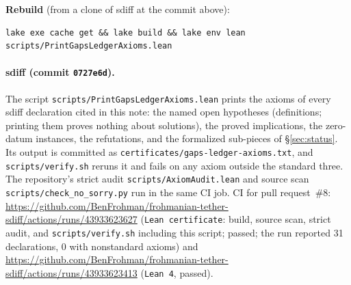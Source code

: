 \documentclass[11pt]{article}
\theoremstyle{plain}
\theoremstyle{definition}
\theoremstyle{remark}
\newcommand{\sdiffsha}{0727e6d}
\begin{document}
\begin{framed}
\textbf{Rebuild} (from a clone of sdiff at the commit above):
\begin{lstlisting}
lake exe cache get && lake build && lake env lean scripts/PrintGapsLedgerAxioms.lean
\end{lstlisting}
\end{framed}

\paragraph{sdiff (commit \texttt{\sdiffsha}).}
The script \texttt{scripts/\hspace{0pt}PrintGapsLedgerAxioms.\hspace{0pt}lean} prints the axioms of every sdiff declaration cited in this note: the named open hypotheses (definitions; printing them proves nothing about solutions), the proved implications, the zero-datum instances, the refutations, and the formalized sub-pieces of \S\ref{sec:status}. Its output is committed as \texttt{certificates/\hspace{0pt}gaps-ledger-axioms.\hspace{0pt}txt}, and \texttt{scripts/\hspace{0pt}verify.\hspace{0pt}sh} reruns it and fails on any axiom outside the standard three. The repository's strict audit \texttt{scripts/\hspace{0pt}AxiomAudit.\hspace{0pt}lean} and source scan \texttt{scripts/\hspace{0pt}check\_\hspace{0pt}no\_\hspace{0pt}sorry.\hspace{0pt}py} run in the same CI job. CI for pull request~\#8: \url{https://github.com/BenFrohman/frohmanian-tether-sdiff/actions/runs/43933623627} (\texttt{Lean certificate}: build, source scan, strict audit, and \texttt{scripts/verify.sh} including this script; passed; the run reported 31 declarations, 0 with nonstandard axioms) and \url{https://github.com/BenFrohman/frohmanian-tether-sdiff/actions/runs/43933623413} (\texttt{Lean 4}, passed).
\end{document}
